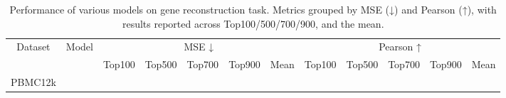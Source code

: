 \begin{table}[htbp]

  \centering

  \renewcommand\arraystretch{1.1}

  \scriptsize

  \caption{Performance of various models on gene reconstruction task. Metrics grouped by MSE (↓) and Pearson (↑), with results reported across Top100/500/700/900, and the mean.}

  \label{tab:topk_grouped_metric_all}

  \setlength{\tabcolsep}{4pt}

  \begin{tabular}{cl|ccccc|ccccc}

    \toprule
    \multirow{2}{*}{Dataset} & \multirow{2}{*}{Model}
      & \multicolumn{5}{c|}{MSE ↓}
      & \multicolumn{5}{c}{Pearson ↑} \\
    \cmidrule(lr){3-7} \cmidrule(lr){8-12}
     & & Top100 & Top500 & Top700 & Top900 & Mean
       & Top100 & Top500 & Top700 & Top900 & Mean \\
    \midrule

    \multirow{9}{*}{PBMC12k}


\end{tabular}
\end{table}

